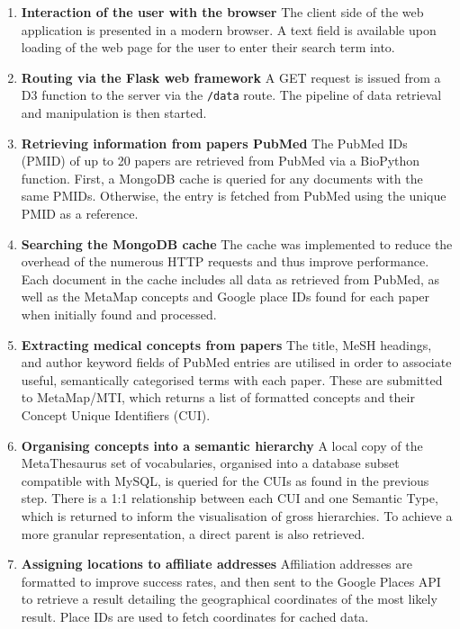 \documentclass[Report.tex]{subfiles}
\begin{document}
\begin{enumerate}
\item{\textbf{Interaction of the user with the browser}} 
\newline The client side of the web application is presented in a modern browser. A text field is available upon loading of the web page for the user to enter their search term into.
\item{\textbf{Routing via the Flask web framework}}
\newline A GET request is issued from a D3 function to the server via the \texttt{/data} route. The pipeline of data retrieval and manipulation is then started.
\item{\textbf{Retrieving information from papers PubMed}}
\newline The PubMed IDs (PMID) of up to 20 papers are retrieved from PubMed via a BioPython function\cite{biopython}. First, a MongoDB cache is queried for any documents with the same PMIDs. Otherwise, the entry is fetched from PubMed using the unique PMID as a reference.
\item{\textbf{Searching the MongoDB cache}}
\newline The cache was implemented to reduce the overhead of the numerous HTTP requests and thus improve performance. Each document in the cache includes all data as retrieved from PubMed, as well as the MetaMap concepts and Google place IDs found for each paper when initially found and processed.
\item{\textbf{Extracting medical concepts from papers}}
\newline The title, MeSH headings, and author keyword fields of PubMed entries are utilised in order to associate useful, semantically categorised terms with each paper. These are submitted to MetaMap/MTI, which returns a list of formatted concepts and their Concept Unique Identifiers (CUI).
\item{\textbf{Organising concepts into a semantic hierarchy}}
\newline A local copy of the MetaThesaurus set of vocabularies, organised into a database subset compatible with MySQL, is queried for the CUIs as found in the previous step. There is a 1:1 relationship between each CUI and one Semantic Type, which is returned to inform the visualisation of gross hierarchies. To achieve a more granular representation, a direct parent is also retrieved.
\item{\textbf{Assigning locations to affiliate addresses}}
\newline Affiliation addresses are formatted to improve success rates, and then sent to the Google Places API to retrieve a result detailing the geographical coordinates of the most likely result. Place IDs are used to fetch coordinates for cached data.

\end{enumerate}
\end{document}
